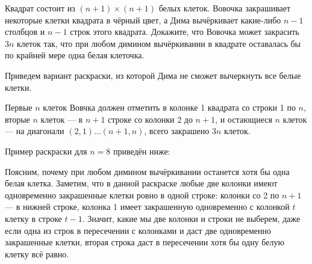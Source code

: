 \begin{itemize}
\itC Квадрат состоит из $(n+1) \times (n+1)$ белых клеток. Вовочка закрашивает некоторые клетки квадрата в чёрный цвет, а Дима вычёркивает какие-либо $n-1$ столбцов и $n-1$ строк этого квадрата. Докажите, что Вовочка может закрасить $3n$ клеток так, что при любом димином вычёркивании в квадрате оставалась бы по крайней мере одна белая клеточка.

\itr Приведем вариант раскраски, из которой Дима не сможет вычеркнуть все белые клетки. 

Первые $n$ клеток Вовчка должен отметить в колонке 1 квадрата со строки 1 по $n$, вторые $n$ клеток --- в $n+1$ строке со колонки 2 до $n+1$, и остающиеся $n$ клеток ---  на диагонали $(2,1) \ldots (n+1,n)$, всего закрашено $3n$ клеток.
          
Пример раскраски для $n=8$ приведён ниже:

\begin{center}\end{center}

Поясним, почему при любом димином вычёркивании останется хотя бы одна белая клетка. 
Заметим, что в данной раскраске любые две 
колонки имеют одновременно закрашенные клетки ровно в одной строке: колонки со 2 по $n+1$ --- 
в нижней строке, колонка 1 имеет закрашенную одновременно с колонкой $t$ клетку в строке $t-1$.
Значит, какие мы две колонки и строки не выберем, даже если одна из строк в пересечении с колонками
и даст две одновременно закрашенные клетки, вторая строка даст в пересечении хотя бы одну белую 
клетку всё равно.

\end{itemize}
